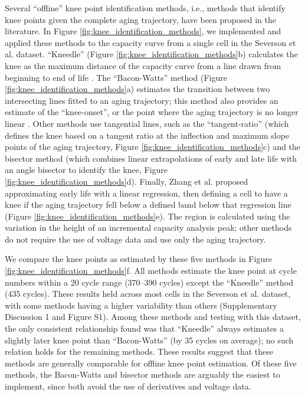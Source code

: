 \documentclass[journal=jpclcd,manuscript=article]{achemso}
\begin{document}
Several ``offline'' knee point identification methods, i.e., methods that identify knee points given the complete aging trajectory, have been proposed in the literature.
In Figure \ref{fig:knee_identification_methods}, we implemented and applied these methods to the capacity curve from a single cell in the Severson et al.\cite{severson_data-driven_2019} dataset.
``Kneedle'' (Figure \ref{fig:knee_identification_methods}b) calculates the knee as the maximum distance of the capacity curve from a line drawn from beginning to end of life \cite{satopaa_finding_2011}.
The ``Bacon-Watts'' method (Figure \ref{fig:knee_identification_methods}a) estimates the transition between two intersecting lines fitted to an aging trajectory; this method also provides an estimate of the ``knee-onset'', or the point where the aging trajectory is no longer linear \cite{fermin-cueto_identification_2020}.
Other methods use tangential lines, such as the ``tangent-ratio'' (which defines the knee based on a tangent ratio at the inflection and maximum slope points of the aging trajectory, Figure \ref{fig:knee_identification_methods}c)\cite{diao_algorithm_2019} and the bisector method (which combines linear extrapolations of early and late life with an angle bisector to identify the knee, Figure \ref{fig:knee_identification_methods}d)\cite{greenbank_automated_2021}. Finally, Zhang et al.\cite{zhang_accelerated_2019} proposed approximating early life with a linear regression, then defining a cell to have a knee if the aging trajectory fell below a defined band below that regression line (Figure \ref{fig:knee_identification_methods}e). The region is calculated using the variation in the height of an incremental capacity analysis peak; other methods do not require the use of voltage data and use only the aging trajectory.

We compare the knee points as estimated by these five methods in Figure \ref{fig:knee_identification_methods}f.
All methods estimate the knee point at cycle numbers within a 20 cycle range (370--390 cycles) except the ``Kneedle'' method (435 cycles). 
These results held across most cells in the Severson et al.\cite{severson_data-driven_2019} dataset, with some methods having a higher variability than others (Supplementary Discussion 1 and Figure S1).
Among these methods and testing with this dataset, the only consistent relationship found was that ``Kneedle'' always estimates a slightly later knee point than ``Bacon-Watts'' (by 35 cycles on average); no such relation holds for the remaining methods. 
These results suggest that these methods are generally comparable for offline knee point estimation.
Of these five methods, the Bacon-Watts and bisector methods are arguably the easiest to implement, since both avoid the use of derivatives and voltage data.
\end{document}
